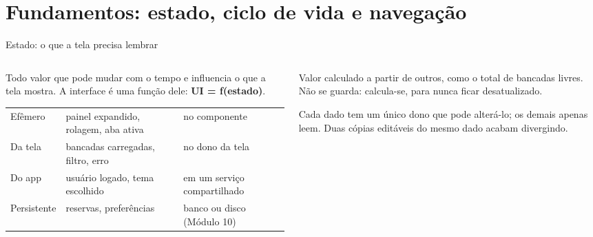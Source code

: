 \section{Fundamentos: estado, ciclo de vida e navegação}

\begin{frame}{Estado: o que a tela precisa lembrar}
  \begin{columns}[T]
    \begin{column}{0.56\textwidth}
      \begin{definicao}[Estado]
        Todo valor que pode mudar com o tempo e influencia o que a tela mostra. A interface é uma função dele: \textbf{UI = f(estado)}.
      \end{definicao}
      \scriptsize
      \begin{tabularx}{\linewidth}{@{}l L l@{}}
        \toprule
         &  &  \\
        \midrule
        Efêmero & painel expandido, rolagem, aba ativa & no componente \\
        Da tela & bancadas carregadas, filtro, erro & no dono da tela \\
        Do app & usuário logado, tema escolhido & em um serviço compartilhado \\
        Persistente & reservas, preferências & banco ou disco (Módulo 10) \\
        \bottomrule
      \end{tabularx}
    \end{column}
    \begin{column}{0.42\textwidth}
      \begin{definicao}
        Valor calculado a partir de outros, como o total de bancadas livres. Não se guarda: calcula-se, para nunca ficar desatualizado.
      \end{definicao}
      \begin{conceito}
        Cada dado tem um único dono que pode alterá-lo; os demais apenas leem. Duas cópias editáveis do mesmo dado acabam divergindo.
      \end{conceito}
    \end{column}
  \end{columns}
\end{frame}

